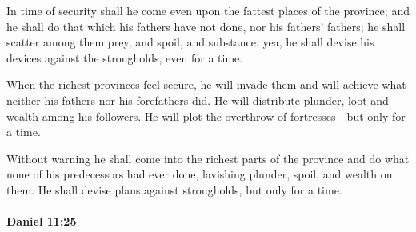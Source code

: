 			\begin{versebox}
					\item[BHS] 
					\item[LXX] 
					\item[ASV] In time of security shall he come even upon the fattest places of the province; and he shall do that which his fathers have not done, nor his fathers' fathers; he shall scatter among them prey, and spoil, and substance: yea, he shall devise his devices against the strongholds, even for a time.
					\item[NIV] When the richest provinces feel secure, he will invade them and will achieve what neither his fathers nor his forefathers did. He will distribute plunder, loot and wealth among his followers. He will plot the overthrow of fortresses—but only for a time.
					\item[NRSV] Without warning he shall come into the richest parts of the province and do what none of his predecessors had ever done, lavishing plunder, spoil, and wealth on them. He shall devise plans against strongholds, but only for a time.
			\end{versebox}

		\paragraph{Daniel 11:25} %
			\label{DANIEL-11-25}


